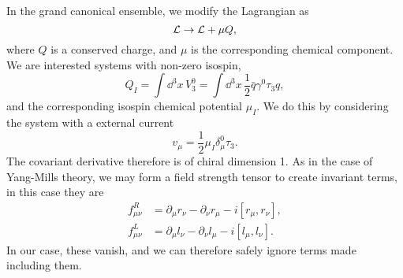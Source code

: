 In the grand canonical ensemble, we modify the Lagrangian as
\begin{equation}
    \mathcal{L} \rightarrow \mathcal{L} + \mu Q,
\end{equation}
where $Q$ is a conserved charge, and $\mu$ is the corresponding chemical component.
We are interested systems with non-zero isospin, 
\begin{equation}
    Q_I = \int \dd^3 x \, V^0_3 = \int \dd^3 x \, \frac{1}{2}  \bar q \gamma^0 \tau_3 q,
\end{equation}
and the corresponding isospin chemical potential $\mu_I$.
We do this by considering the system with a external current
\begin{equation}
    v_\mu = \frac{1}{2} \mu_I \delta_\mu^0 \tau_3.
\end{equation}
The covariant derivative therefore is of chiral dimension 1.
As in the case of Yang-Mills theory, we may form a field strength tensor to create invariant terms, in this case they are
\begin{align}
    f_{\mu\nu}^R &= \partial_\mu r_\nu - \partial_\nu r_\mu - i [r_\mu, r_\nu], \\
    f_{\mu\nu}^L &= \partial_\mu l_\nu - \partial_\nu l_\mu - i [l_\mu, l_\nu].
\end{align}
In our case, these vanish, and we can therefore safely ignore terms made including them.

